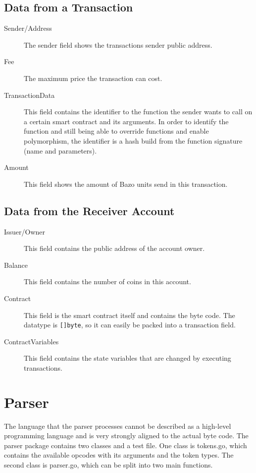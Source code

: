 \subsection{Data from a Transaction}
\begin{description}
  \item[Sender/Address] The sender field shows the transactions sender public address.
  \item[Fee] The maximum price the transaction can cost.
  \item[TransactionData] This field contains the identifier to the function the sender wants to call on a certain smart contract and its arguments. In order to identify the function and still being able to override functions and enable polymorphism, the identifier is a hash build from the function signature (name and parameters).
  \item[Amount] This field shows the amount of Bazo units send in this transaction.
\end{description} 

\subsection{Data from the Receiver Account}
\begin{description}
  \item[Issuer/Owner] This field contains the public address of the account owner.
  \item[Balance] This field contains the number of coins in this account.
  \item[Contract] This field is the smart contract itself and contains the byte code. The datatype is \texttt{[]byte}, so it can easily be packed into a transaction field.
  \item[ContractVariables] This field contains the state variables that are changed by executing transactions.
\end{description}

\section{Parser}
The language that the parser processes cannot be described as a high-level programming language and is very strongly aligned to the actual byte code. The parser package contains two classes and a test file. One class is tokens.go, which contains the available opcodes with its arguments and the token types. The second class is parser.go, which can be split into two main functions. 

